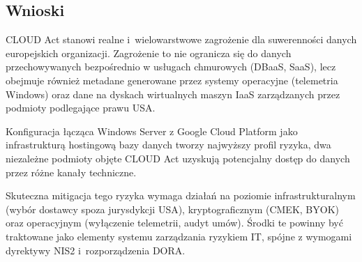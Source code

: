 \subsection{Wnioski}

CLOUD Act stanowi realne i~wielowarstwowe zagrożenie dla suwerenności
danych europejskich organizacji. Zagrożenie to nie ogranicza się do
danych przechowywanych bezpośrednio w usługach chmurowych (DBaaS, SaaS),
lecz obejmuje również metadane generowane przez systemy operacyjne
(telemetria Windows) oraz dane na dyskach wirtualnych maszyn IaaS
zarządzanych przez podmioty podlegające prawu USA.

Konfiguracja łącząca Windows Server z Google Cloud Platform jako
infrastrukturą hostingową bazy danych tworzy najwyższy profil
ryzyka, dwa niezależne podmioty objęte CLOUD Act uzyskują potencjalny dostęp do danych przez różne kanały techniczne.

Skuteczna mitigacja tego ryzyka wymaga działań na poziomie infrastrukturalnym (wybór dostawcy spoza jurysdykcji USA), kryptograficznym
(CMEK, BYOK) oraz operacyjnym (wyłączenie telemetrii, audyt umów).
Środki te powinny być traktowane jako elementy systemu zarządzania ryzykiem IT, spójne z wymogami dyrektywy NIS2 i~rozporządzenia DORA.

